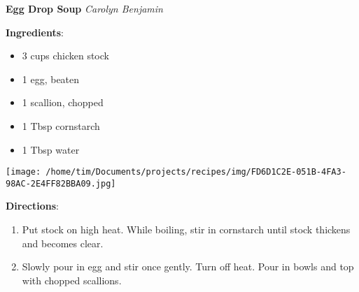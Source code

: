 \documentclass[11pt, twoside, openany]{book}
\begin{document}
\noindent\begin{minipage}[t]{\linewidth}%
{\Large\textbf{Egg Drop Soup}} \label{egg-drop-soup}\hfill\textit{Carolyn Benjamin}\\
\noindent\begin{minipage}[t]{0.78\linewidth}%
\textbf{Ingredients}:\vspace{-3mm}
\begin{multicols}{2}
\begin{itemize}\setlength\itemsep{-1mm}
\item 3 cups chicken stock
\item 1 egg, beaten
\item 1 scallion, chopped
\item 1 Tbsp cornstarch
\item 1 Tbsp water
\end{itemize}
\end{multicols}
\end{minipage}
\noindent\begin{minipage}[t]{0.18\linewidth}
\centering \strut\vspace*{-\baselineskip}\newline
\texttt{[image: /home/tim/Documents/projects/recipes/img/FD6D1C2E-051B-4FA3-98AC-2E4FF82BBA09.jpg]}\\
\end{minipage}\vspace{3mm}
\textbf{Directions}:
\vspace{-3mm}\begin{enumerate}\setlength\itemsep{-1mm}
\item Put stock on high heat. While boiling, stir in cornstarch until stock thickens and becomes clear.
\item Slowly pour in egg and stir once gently. Turn off heat. Pour in bowls and top with chopped scallions.
\end{enumerate}
\end{minipage}\vspace{8mm}
\end{document}
